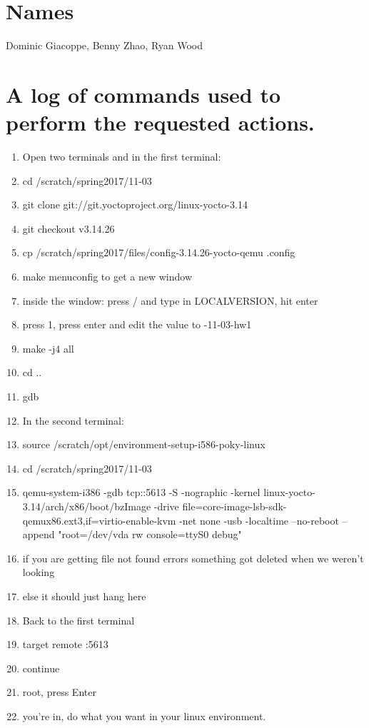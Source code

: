 \documentclass[IEEEtran,letterpaper,10pt,notitlepage,draftclsnofoot,onecolumn]{article}
\begin{document}
\section{Names} 
Dominic Giacoppe, Benny Zhao, Ryan Wood
\section{A log of commands used to perform the requested actions.}
\begin{enumerate}
\item Open two terminals and in the first terminal:
\item cd /scratch/spring2017/11-03
\item git clone git://git.yoctoproject.org/linux-yocto-3.14
\item git checkout v3.14.26
\item cp /scratch/spring2017/files/config-3.14.26-yocto-qemu .config
\item make menuconfig to get a new window
\item inside the window: press / and type in LOCALVERSION, hit enter
\item press 1, press enter and edit the value to -11-03-hw1
\item make -j4 all
\item cd .. 
\item gdb
\item In the second terminal:
\item source /scratch/opt/environment-setup-i586-poky-linux
\item cd /scratch/spring2017/11-03
\sloppy
\item qemu-system-i386 -gdb tcp::5613 -S -nographic -kernel linux-yocto-3.14/arch/x86/boot/bzImage  -drive file=core-image-lsb-sdk-qemux86.ext3,if=virtio-enable-kvm -net none -usb -localtime --no-reboot --append "root=/dev/vda rw console=ttyS0 debug"
\item if you are getting file not found errors something got deleted when we weren't looking
\item else it should just hang here
\item Back to the first terminal
\item target remote :5613
\item continue
\item root, press Enter
\item you're in, do what you want in your linux environment.
\end{enumerate} 
\end{document}
